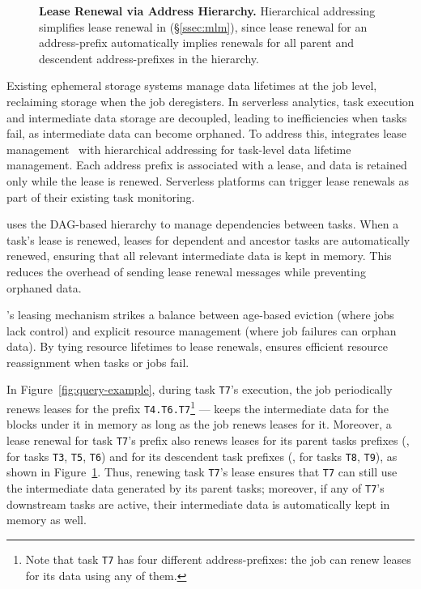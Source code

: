 \begin{figure}[t]
\begin{tikzpicture}[font=\scriptsize, yscale=0.75, task/.style={draw, circle, align=center, inner sep=2pt}, block/.style={draw, align=center, fill=gray!20, inner sep=2pt}]
  \end{tikzpicture}
  \caption[Lease Renewal via Address Hierarchy]{\textbf{Lease Renewal via Address Hierarchy.} Hierarchical addressing simplifies lease renewal in \jiffy (\S\ref{ssec:mlm}), since lease renewal for an address-prefix automatically implies renewals for all parent and descendent address-prefixes in the hierarchy.}\label{fig:mlm}
\end{figure}

Existing ephemeral storage systems manage data lifetimes at the job level, reclaiming storage when the job deregisters. In serverless analytics, task execution and intermediate data storage are decoupled, leading to inefficiencies when tasks fail, as intermediate data can become orphaned. To address this, \jiffy integrates lease management~\cite{gray1989leases, chubby, dhcplease} with hierarchical addressing for task-level data lifetime management. Each address prefix is associated with a lease, and data is retained only while the lease is renewed. Serverless platforms can trigger lease renewals as part of their existing task monitoring.

\jiffy uses the DAG-based hierarchy to manage dependencies between tasks. When a task’s lease is renewed, leases for dependent and ancestor tasks are automatically renewed, ensuring that all relevant intermediate data is kept in memory. This reduces the overhead of sending lease renewal messages while preventing orphaned data.

\jiffy’s leasing mechanism strikes a balance between age-based eviction (where jobs lack control) and explicit resource management (where job failures can orphan data). By tying resource lifetimes to lease renewals, \jiffy ensures efficient resource reassignment when tasks or jobs fail.

 In Figure~\ref{fig:query-example}, during task \texttt{T7}'s execution, the job periodically renews leases for the prefix \texttt{T4.T6.T7}\footnote{Note that task \texttt{T7} has four different address-prefixes: the job can renew leases for its data using any of them.} --- \jiffy keeps the intermediate data for the blocks under it in memory as long as the job renews leases for it. Moreover, a lease renewal for task \texttt{T7}'s prefix also renews leases for its parent tasks prefixes (\ie, for tasks \texttt{T3}, \texttt{T5}, \texttt{T6}) and for its descendent task prefixes (\ie, for tasks \texttt{T8}, \texttt{T9}), as shown in Figure~\ref{fig:mlm}. Thus, renewing task \texttt{T7}'s lease ensures that \texttt{T7} can still use the intermediate data generated by its parent tasks; moreover, if any of \texttt{T7}'s downstream tasks are active, their intermediate data is automatically kept in memory as well.



